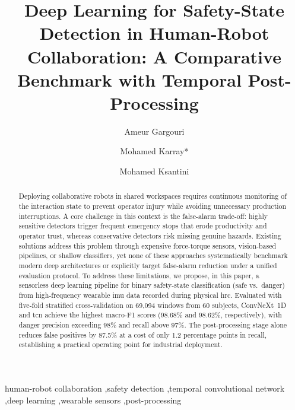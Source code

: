 \documentclass[3p,times,procedia]{elsarticle}
\begin{document}
\begin{frontmatter}


\title{Deep Learning for Safety-State Detection in Human-Robot Collaboration: A Comparative Benchmark with Temporal Post-Processing}

\author[a,b]{Ameur Gargouri}
\author[b]{Mohamed Karray*}
\author[a]{Mohamed Ksantini}

\address[a]{ATISP Lab, ENET'Com, University of Sfax, Sfax, Tunisia}
\address[b]{ESME Research Lab, Ivry-sur-Seine, France}

\begin{abstract}
Deploying collaborative robots in shared workspaces requires continuous monitoring of the interaction state to prevent operator injury while avoiding unnecessary production interruptions. A core challenge in this context is the false-alarm trade-off: highly sensitive detectors trigger frequent emergency stops that erode productivity and operator trust, whereas conservative detectors risk missing genuine hazards. Existing solutions address this problem through expensive force-torque sensors, vision-based pipelines, or shallow classifiers, yet none of these approaches systematically benchmark modern deep architectures or explicitly target false-alarm reduction under a unified evaluation protocol. To address these limitations, we propose, in this paper, a sensorless deep learning pipeline for binary safety-state classification (safe vs.\ danger) from high-frequency wearable \ac{imu} data recorded during physical \ac{hrc}. Evaluated with five-fold stratified cross-validation on 69,094 windows from 60 subjects, ConvNeXt~1D and \ac{tcn} achieve the highest macro-F1 scores (98.68\% and 98.62\%, respectively), with danger precision exceeding 98\% and recall above 97\%. The post-processing stage alone reduces false positives by 87.5\% at a cost of only 1.2 percentage points in recall, establishing a practical operating point for industrial deployment.
\end{abstract}

\begin{keyword}
human-robot collaboration \sep safety detection \sep temporal convolutional network \sep deep learning \sep wearable sensors \sep post-processing
\end{keyword}

\end{frontmatter}
\end{document}
